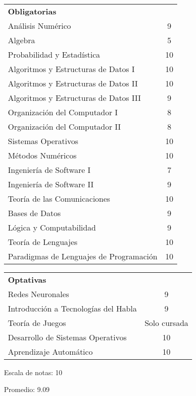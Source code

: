 \documentclass[a4paper,10pt]{article}
\begin{document}
\begin{tabular}{ l c }

\textbf{Obligatorias} \smallskip  & \\ 
Análisis Numérico & 9\\
Algebra & 5\\
Probabilidad y Estadística & 10\\
Algoritmos y Estructuras de Datos I & 10\\
Algoritmos y Estructuras de Datos II & 10\\
Algoritmos y Estructuras de Datos III & 9\\
Organización del Computador I & 8\\
Organización del Computador II & 8\\
Sistemas Operativos & 10\\
Métodos Numéricos & 10\\
Ingeniería de Software I & 7\\
Ingeniería de Software II & 9\\
Teoría de las Comunicaciones & 10\\
Bases de Datos & 9\\
Lógica y Computabilidad & 9\\
Teoría de Lenguajes & 10\\
Paradigmas de Lenguajes de Programación & 10\\
\end{tabular}

\begin{tabular}{l c}
\textbf{Optativas} \smallskip & \\
Redes Neuronales & 9\\
Introducción a Tecnologías del Habla & 9\\
Teoría de Juegos & Solo cursada\\
Desarrollo de Sistemas Operativos & 10\\
Aprendizaje Automático & 10\\
\end{tabular}

\bigskip

Escala de notas: 10

Promedio: 9.09
\end{document}
